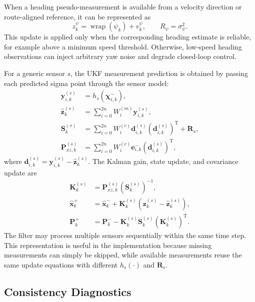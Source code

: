 \documentclass[conference]{IEEEtran}
\begin{document}
When a heading pseudo-measurement is available from a velocity direction or route-aligned reference, it can be represented as
\begin{equation}
z_k^{\psi}=\operatorname{wrap}(\psi_k)+v_k^{\psi},
\qquad R_{\psi}=\sigma_{\psi}^{2}.
\label{eq:yaw_measurement}
\end{equation}
This update is applied only when the corresponding heading estimate is reliable, for example above a minimum speed threshold. Otherwise, low-speed heading observations can inject arbitrary yaw noise and degrade closed-loop control.

For a generic sensor $s$, the UKF measurement prediction is obtained by passing each predicted sigma point through the sensor model:
\begin{align}
\mathbf{y}_{i,k}^{(s)} &= h_s(\boldsymbol{\chi}_{i,k}^{-}),
\label{eq:measurement_sigma}\\
\hat{\mathbf{z}}_k^{(s)} &= \sum_{i=0}^{2n} W_i^{(m)}\mathbf{y}_{i,k}^{(s)},
\label{eq:measurement_mean}\\
\mathbf{S}_k^{(s)} &= \sum_{i=0}^{2n} W_i^{(c)}\mathbf{d}_{i,k}^{(s)}
(\mathbf{d}_{i,k}^{(s)})^{\mathrm{T}} + \mathbf{R}_s,
\label{eq:innovation_cov}\\
\mathbf{P}_{xz,k}^{(s)} &= \sum_{i=0}^{2n} W_i^{(c)}\mathbf{e}_{i,k}^{-}
(\mathbf{d}_{i,k}^{(s)})^{\mathrm{T}},
\label{eq:cross_covariance}
\end{align}
where $\mathbf{d}_{i,k}^{(s)}=\mathbf{y}_{i,k}^{(s)}-\hat{\mathbf{z}}_k^{(s)}$. The Kalman gain, state update, and covariance update are
\begin{align}
\mathbf{K}_k^{(s)} &= \mathbf{P}_{xz,k}^{(s)}(\mathbf{S}_k^{(s)})^{-1},
\label{eq:kalman_gain}\\
\hat{\mathbf{x}}_k^{+} &= \hat{\mathbf{x}}_k^{-}
+ \mathbf{K}_k^{(s)}\left(\mathbf{z}_k^{(s)}-\hat{\mathbf{z}}_k^{(s)}\right),
\label{eq:state_update}\\
\mathbf{P}_k^{+} &= \mathbf{P}_k^{-}
- \mathbf{K}_k^{(s)}\mathbf{S}_k^{(s)}(\mathbf{K}_k^{(s)})^{\mathrm{T}}.
\label{eq:cov_update}
\end{align}
The filter may process multiple sensors sequentially within the same time step. This representation is useful in the implementation because missing measurements can simply be skipped, while available measurements reuse the same update equations with different $h_s(\cdot)$ and $\mathbf{R}_s$.

\subsection{Consistency Diagnostics}
\end{document}
